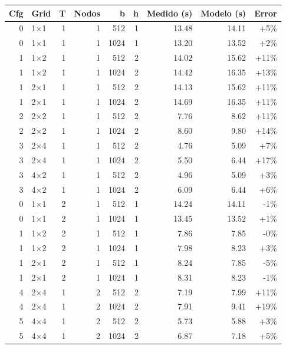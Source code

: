 \begin{tabular}{rlrrrrrrr}
\toprule
Cfg & Grid & T & Nodos & b & h & Medido (s) & Modelo (s) & Error \\
\midrule
0 & 1$\times$1 & 1 & 1 & 512 & 1 & 13.48 & 14.11 & +5\% \\
0 & 1$\times$1 & 1 & 1 & 1024 & 1 & 13.20 & 13.52 & +2\% \\
1 & 1$\times$2 & 1 & 1 & 512 & 2 & 14.02 & 15.62 & +11\% \\
1 & 1$\times$2 & 1 & 1 & 1024 & 2 & 14.42 & 16.35 & +13\% \\
1 & 2$\times$1 & 1 & 1 & 512 & 2 & 14.13 & 15.62 & +11\% \\
1 & 2$\times$1 & 1 & 1 & 1024 & 2 & 14.69 & 16.35 & +11\% \\
2 & 2$\times$2 & 1 & 1 & 512 & 2 & 7.76 & 8.62 & +11\% \\
2 & 2$\times$2 & 1 & 1 & 1024 & 2 & 8.60 & 9.80 & +14\% \\
3 & 2$\times$4 & 1 & 1 & 512 & 2 & 4.76 & 5.09 & +7\% \\
3 & 2$\times$4 & 1 & 1 & 1024 & 2 & 5.50 & 6.44 & +17\% \\
3 & 4$\times$2 & 1 & 1 & 512 & 2 & 4.96 & 5.09 & +3\% \\
3 & 4$\times$2 & 1 & 1 & 1024 & 2 & 6.09 & 6.44 & +6\% \\
0 & 1$\times$1 & 2 & 1 & 512 & 1 & 14.24 & 14.11 & -1\% \\
0 & 1$\times$1 & 2 & 1 & 1024 & 1 & 13.45 & 13.52 & +1\% \\
1 & 1$\times$2 & 2 & 1 & 512 & 1 & 7.86 & 7.85 & -0\% \\
1 & 1$\times$2 & 2 & 1 & 1024 & 1 & 7.98 & 8.23 & +3\% \\
1 & 2$\times$1 & 2 & 1 & 512 & 1 & 8.24 & 7.85 & -5\% \\
1 & 2$\times$1 & 2 & 1 & 1024 & 1 & 8.31 & 8.23 & -1\% \\
4 & 2$\times$4 & 1 & 2 & 512 & 2 & 7.19 & 7.99 & +11\% \\
4 & 2$\times$4 & 1 & 2 & 1024 & 2 & 7.91 & 9.41 & +19\% \\
5 & 4$\times$4 & 1 & 2 & 512 & 2 & 5.73 & 5.88 & +3\% \\
5 & 4$\times$4 & 1 & 2 & 1024 & 2 & 6.87 & 7.18 & +5\% \\
\bottomrule
\end{tabular}
